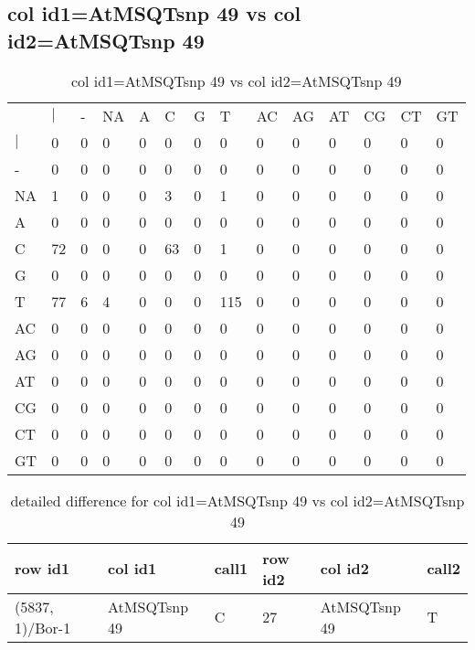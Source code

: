 \subsection{col id1=AtMSQTsnp 49 vs col id2=AtMSQTsnp 49}
\begin{center}
\begin{longtable}{|l|l|l|l|l|l|l|l|l|l|l|l|l|l|}
\caption{col id1=AtMSQTsnp 49 vs col id2=AtMSQTsnp 49} \label{table_dm940}\\
\hline
\\
\hline
&$|$&-&NA&A&C&G&T&AC&AG&AT&CG&CT&GT\\
$|$&0&0&0&0&0&0&0&0&0&0&0&0&0\\
-&0&0&0&0&0&0&0&0&0&0&0&0&0\\
NA&1&0&0&0&3&0&1&0&0&0&0&0&0\\
A&0&0&0&0&0&0&0&0&0&0&0&0&0\\
C&72&0&0&0&63&0&1&0&0&0&0&0&0\\
G&0&0&0&0&0&0&0&0&0&0&0&0&0\\
T&77&6&4&0&0&0&115&0&0&0&0&0&0\\
AC&0&0&0&0&0&0&0&0&0&0&0&0&0\\
AG&0&0&0&0&0&0&0&0&0&0&0&0&0\\
AT&0&0&0&0&0&0&0&0&0&0&0&0&0\\
CG&0&0&0&0&0&0&0&0&0&0&0&0&0\\
CT&0&0&0&0&0&0&0&0&0&0&0&0&0\\
GT&0&0&0&0&0&0&0&0&0&0&0&0&0\\
\hline
\end{longtable}
\end{center}

\begin{center}
\begin{longtable}{|l|l|l|l|l|l|}
\caption{detailed difference for col id1=AtMSQTsnp 49 vs col id2=AtMSQTsnp 49} \label{table_dm941}\\
\hline
row id1&col id1&call1&row id2&col id2&call2\\
\hline
(5837, 1)/Bor-1&AtMSQTsnp 49&C&27&AtMSQTsnp 49&T\\
\hline
\end{longtable}
\end{center}

